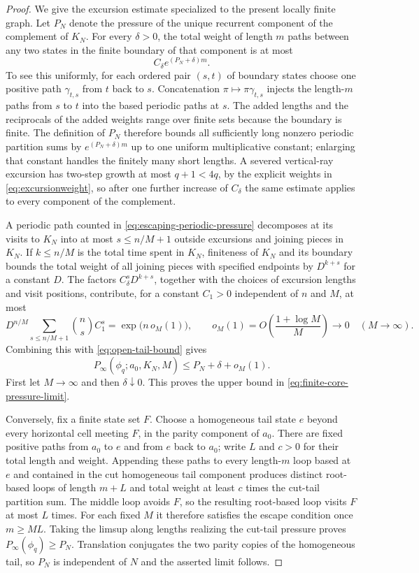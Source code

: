 \documentclass[10pt,a4paper]{amsart}
\begin{document}
\begin{proof}
We give the excursion estimate specialized to the present locally finite
graph.  Let $P_N$ denote the pressure of the unique recurrent component of
the complement of $K_N$.  For every $\delta>0$, the total weight of length
$m$ paths between any two states in the finite boundary of that component is
at most
\begin{equation}\label{eq:open-tail-bound}
 C_\delta e^{(P_N+\delta)m}.
\end{equation}
To see this uniformly, for each ordered pair $(s,t)$ of boundary states choose
one positive path $\gamma_{t,s}$ from $t$ back to $s$.  Concatenation
$\pi\mapsto\pi\gamma_{t,s}$ injects the length-$m$ paths from $s$ to $t$ into
the based periodic paths at $s$.  The added lengths and the reciprocals of the
added weights range over finite sets because the boundary is finite.  The
definition of $P_N$ therefore bounds all sufficiently long nonzero periodic
partition sums by $e^{(P_N+\delta)m}$ up to one uniform multiplicative
constant; enlarging that constant handles the finitely many short lengths.
A severed vertical-ray excursion has two-step growth at most $q+1<4q$, by the
explicit weights in \eqref{eq:excursionweight}, so after one further increase
of $C_\delta$ the same estimate applies to every component of the complement.

A periodic path counted in \eqref{eq:escaping-periodic-pressure} decomposes at
its visits to $K_N$ into at most $s\le n/M+1$ outside excursions and joining
pieces in $K_N$.  If $k\le n/M$ is the total time spent in $K_N$, finiteness
of $K_N$ and its boundary bounds the total weight of all joining pieces with
specified endpoints by $D^{k+s}$ for a constant $D$.  The factors
$C_\delta^sD^{k+s}$, together with the choices of excursion lengths and visit
positions, contribute, for a constant $C_1>0$ independent of $n$ and $M$, at most
\[
 D^{n/M}\sum_{s\le n/M+1}\binom ns C_1^s
 =\exp\!\bigl(n\,o_M(1)\bigr),
 \qquad o_M(1)=O\!\left(\frac{1+\log M}{M}\right)
 \longrightarrow0\quad(M\to\infty).
\]
Combining this with \eqref{eq:open-tail-bound} gives
\[
 P_\infty(\phi_q;a_0,K_N,M)
 \le P_N+\delta+o_M(1).
\]
First let $M\to\infty$ and then $\delta\downarrow0$.  This proves the upper
bound in \eqref{eq:finite-core-pressure-limit}.

Conversely, fix a finite state set $F$.  Choose a homogeneous tail state $e$
beyond every horizontal cell meeting $F$, in the parity component of $a_0$.
There are fixed positive paths from $a_0$ to $e$ and from $e$ back to $a_0$;
write $L$ and $c>0$ for their total length and weight.  Appending these paths
to every length-$m$ loop based at $e$ and contained in the cut homogeneous
tail component produces distinct root-based loops of length $m+L$ and total
weight at least $c$ times the cut-tail partition sum.  The middle loop avoids
$F$, so the resulting root-based loop visits $F$ at most $L$ times.  For each
fixed $M$ it therefore satisfies the escape condition once $m\ge ML$.
Taking the limsup along lengths realizing the cut-tail pressure proves
$P_\infty(\phi_q)\ge P_N$.  Translation conjugates the two parity copies of
the homogeneous tail, so $P_N$ is independent of $N$ and the asserted limit
follows.
\end{proof}
\end{document}
